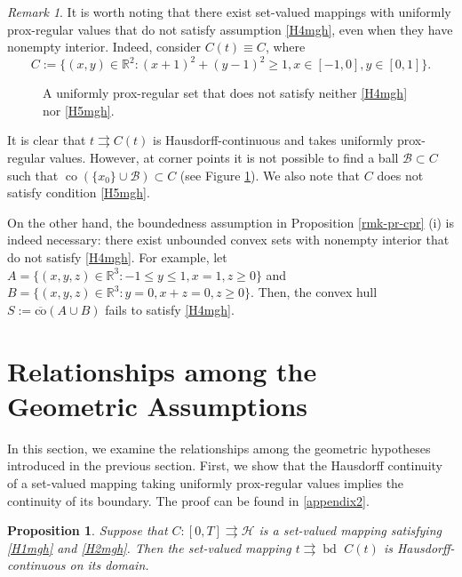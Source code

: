 \documentclass[preprint,12pt]{elsarticle}
\renewcommand{\H}{\mathcal{H}}
\newcommand{\R}{\mathbb{R}}
\newcommand{\tto}{\rightrightarrows}
\newcommand{\ov}{\overline}
\newcommand{\bd}{{\operatorname{bd \ }}}
\theoremstyle{plain}
\newtheorem{proposition}[theorem]{Proposition}
\theoremstyle{definition}
\theoremstyle{remark}
\newtheorem{remark}[theorem]{Remark}
\begin{document}
    \begin{remark} 
    It is worth noting that there exist set-valued mappings with uniformly prox-regular values that do not satisfy assumption \ref{H4mgh}, even when they have nonempty interior. Indeed, consider $C(t)\equiv C$, where 
    $$C:= \{(x,y)\in\R^2 : (x+1)^2 + (y-1)^2\geq 1, x\in [-1,0], y\in [0,1]\}.
    $$
		\begin{figure}[h]
			\centering
			\captionsetup{justification=centering}
			\caption{A uniformly prox-regular set that does not satisfy neither \ref{H4mgh} nor \ref{H5mgh}.}
			\label{fig:enter-label}
		\end{figure}
It is clear that $t\tto C(t)$ is Hausdorff-continuous and takes uniformly prox-regular values. However, at corner points it is not possible to find a ball $\mathscr{B}\subset C$ such that $\operatorname{co}(\{x_0\}\cup \mathscr{B})\subset C$ (see Figure \ref{fig:enter-label}). We also note that $C$ does not satisfy condition \ref{H5mgh}. 

\noindent On the other hand, the boundedness assumption in Proposition \ref{rmk-pr-cpr} (i) is indeed necessary: there exist unbounded convex sets with nonempty interior that do not satisfy \ref{H4mgh}. For example, let $A = \{ (x,y,z)\in \mathbb{R}^3 : -1\leq y\leq 1, x=1 ,z\geq 0\}$ and $B = \{ (x,y,z)\in \mathbb{R}^3 : y=0, x+z=0, z\geq 0 \}$. Then, the convex hull $S:= \ov{\text{co}}(A\cup B)$ fails to satisfy \ref{H4mgh}.
	\end{remark}

	\section{Relationships among the Geometric Assumptions}\label{sec4}

    In this section, we examine the relationships among the geometric hypotheses introduced in the previous section. First, we show that the Hausdorff continuity of a set-valued mapping taking uniformly prox-regular values implies the continuity of its boundary. The proof can be found in \ref{appendix2}.
	\begin{proposition}\label{h1h2-bd}
		Suppose that $C\colon [0,T]\tto \H$ is a set-valued mapping satisfying \ref{H1mgh} and  \ref{H2mgh}. Then the set-valued mapping $t\tto \bd C(t)$ is Hausdorff-continuous on its domain.
	\end{proposition}
	
\end{document}
